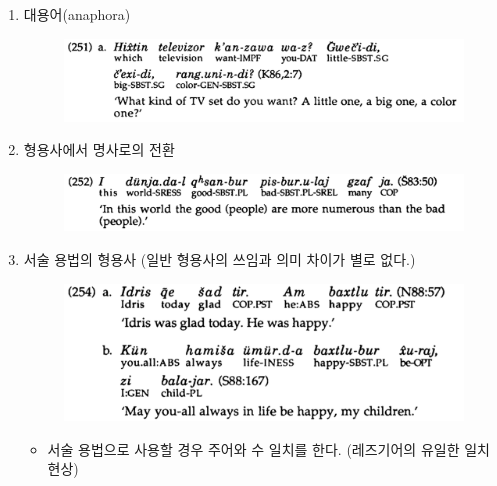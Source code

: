 \begin{itemize}
\begin{enumerate}
\item 대용어(anaphora)
\begin{figure}[H]
\centerline{\includegraphics[width=.8\linewidth]{Lezgian/src/ex251a.png}}
\end{figure}
\item 형용사에서 명사로의 전환
\begin{figure}[H]
\centerline{\includegraphics[width=.8\linewidth]{Lezgian/src/ex252.png}}
\end{figure}
\item 서술 용법의 형용사 (일반 형용사의 쓰임과 의미 차이가 별로 없다.)
\begin{figure}[H]
\centerline{\includegraphics[width=.8\linewidth]{Lezgian/src/ex254.png}}
\end{figure}
\begin{itemize}
\item 서술 용법으로 사용할 경우 주어와 수 일치를 한다. (레즈기어의 유일한 일치 현상)
\end{itemize}
\end{enumerate}
\end{itemize}

